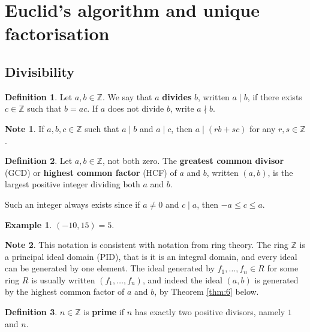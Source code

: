 \documentclass{article}
\newcommand{\Z}{\mathbb{Z}}
\newcommand{\rb}[1]{\left( #1 \right)}
\theoremstyle{definition}\newtheorem{definition}{Definition}
\theoremstyle{definition}\newtheorem{remark}[definition]{Remark}
\theoremstyle{definition}\newtheorem*{example}{Example}
\theoremstyle{definition}\newtheorem*{note}{Note}
\begin{document}
\section{Euclid's algorithm and unique factorisation}

\subsection{Divisibility}

\begin{definition}
Let $ a, b \in \Z $. We say that $ a $ \textbf{divides} $ b $, written $ a \mid b $, if there exists $ c \in \Z $ such that $ b = ac $. If $ a $ does not divide $ b $, write $ a \nmid b $.
\end{definition}

\begin{note}
If $ a, b, c \in \Z $ such that $ a \mid b $ and $ a \mid c $, then $ a \mid \rb{rb + sc} $ for any $ r, s \in \Z $.
\end{note}

\begin{definition}
Let $ a, b \in \Z $, not both zero. The \textbf{greatest common divisor} (GCD) or \textbf{highest common factor} (HCF) of $ a $ and $ b $, written $ \rb{a, b} $, is the largest positive integer dividing both $ a $ and $ b $.
\end{definition}

Such an integer always exists since if $ a \ne 0 $ and $ c \mid a $, then $ -a \le c \le a $.

\begin{example}
$ \rb{-10, 15} = 5 $.
\end{example}

\begin{note}
This notation is consistent with notation from ring theory. The ring $ \Z $ is a principal ideal domain (PID), that is it is an integral domain, and every ideal can be generated by one element. The ideal generated by $ f_1, \dots, f_n \in R $ for some ring $ R $ is usually written $ \rb{f_1, \dots, f_n} $, and indeed the ideal $ \rb{a, b} $ is generated by the highest common factor of $ a $ and $ b $, by Theorem \ref{thm:6} below.
\end{note}

\begin{definition}
$ n \in \Z $ is \textbf{prime} if $ n $ has exactly two positive divisors, namely $ 1 $ and $ n $.
\end{definition}
\end{document}
